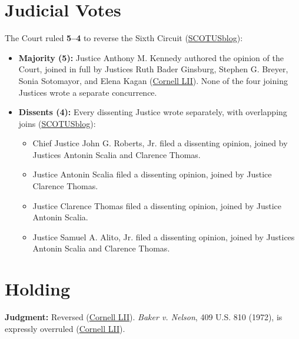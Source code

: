 \documentclass[12pt]{article}
\begin{document}
\section{Judicial Votes}

The Court ruled \textbf{5--4} to reverse the Sixth Circuit (\href{https://www.scotusblog.com/cases/obergefell-v-hodges/}{SCOTUSblog}):
\begin{itemize}
    \item \textbf{Majority (5):} Justice Anthony M. Kennedy authored the opinion of the Court, joined in full by Justices Ruth Bader Ginsburg, Stephen G. Breyer, Sonia Sotomayor, and Elena Kagan (\href{https://www.law.cornell.edu/supremecourt/text/14-556}{Cornell LII}). None of the four joining Justices wrote a separate concurrence.
    \item \textbf{Dissents (4):} Every dissenting Justice wrote separately, with overlapping joins (\href{https://www.scotusblog.com/cases/obergefell-v-hodges/}{SCOTUSblog}):
    \begin{itemize}
        \item Chief Justice John G. Roberts, Jr. filed a dissenting opinion, joined by Justices Antonin Scalia and Clarence Thomas.
        \item Justice Antonin Scalia filed a dissenting opinion, joined by Justice Clarence Thomas.
        \item Justice Clarence Thomas filed a dissenting opinion, joined by Justice Antonin Scalia.
        \item Justice Samuel A. Alito, Jr. filed a dissenting opinion, joined by Justices Antonin Scalia and Clarence Thomas.
    \end{itemize}
\end{itemize}

\section{Holding}

\textbf{Judgment:} Reversed (\href{https://www.law.cornell.edu/supremecourt/text/14-556}{Cornell LII}). \textit{Baker v. Nelson}, 409 U.S. 810 (1972), is expressly overruled (\href{https://www.law.cornell.edu/supremecourt/text/14-556}{Cornell LII}).
\end{document}

